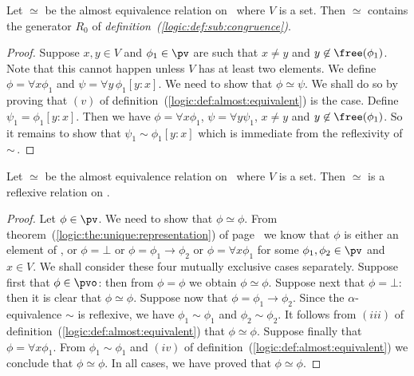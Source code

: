 \begin{prop}\label{logic:prop:almost:contains:r0}
Let $\simeq$ be the almost equivalence relation on \pv\ where $V$ is
a set. Then $\simeq$ contains the generator $R_{0}$ of {\em
definition~(\ref{logic:def:sub:congruence})}.
\end{prop}

\noindent
\begin{proof}
Suppose $x,y\in V$ and $\phi_{1}\in\pv$ are such that $x\neq y$ and
$y\not\in\free(\phi_{1})$. Note that this cannot happen unless $V$
has at least two elements. We define $\phi=\forall x\phi_{1}$ and
$\psi=\forall y\,\phi_{1}[y\!:\!x]$. We need to show that
$\phi\simeq\psi$. We shall do so by proving that $(v)$ of
definition~(\ref{logic:def:almost:equivalent}) is the case. Define
$\psi_{1}=\phi_{1}[y\!:\!x]$. Then we have $\phi=\forall x\phi_{1}$,
$\psi=\forall y\psi_{1}$, $x\neq y$ and $y\not\in\free(\phi_{1})$.
So it remains to show that $\psi_{1}\sim\phi_{1}[y\!:\!x]$ which is
immediate from the reflexivity of $\sim$\,.
\end{proof}

\begin{prop}\label{logic:prop:almost:reflexive}
Let $\simeq$ be the almost equivalence relation on \pv\ where $V$ is
a set. Then $\simeq$ is a reflexive relation on \pv.
\end{prop}

\noindent
\begin{proof}
Let $\phi\in\pv$. We need to show that $\phi\simeq\phi$. From
theorem~(\ref{logic:the:unique:representation}) of
page~\pageref{logic:the:unique:representation} we know that $\phi$
is either an element of \pvo, or $\phi=\bot$ or
$\phi=\phi_{1}\to\phi_{2}$ or $\phi=\forall x\phi_{1}$ for some
$\phi_{1},\phi_{2}\in\pv$ and $x\in V$. We shall consider these four
mutually exclusive cases separately. Suppose first that
$\phi\in\pvo$: then from $\phi=\phi$ we obtain $\phi\simeq\phi$.
Suppose next that $\phi=\bot$: then it is clear that
$\phi\simeq\phi$. Suppose now that $\phi=\phi_{1}\to\phi_{2}$. Since
the $\alpha$-equivalence $\sim$ is reflexive, we have
$\phi_{1}\sim\phi_{1}$ and $\phi_{2}\sim\phi_{2}$. It follows from
$(iii)$ of definition~(\ref{logic:def:almost:equivalent}) that
$\phi\simeq\phi$. Suppose finally that $\phi=\forall x\phi_{1}$.
From $\phi_{1}\sim\phi_{1}$ and $(iv)$ of
definition~(\ref{logic:def:almost:equivalent}) we conclude that
$\phi\simeq\phi$. In all cases, we have proved that
$\phi\simeq\phi$.
\end{proof}


